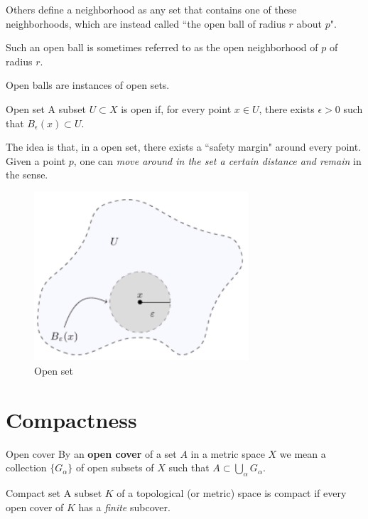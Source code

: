 \begin{remark}
Others define a neighborhood as any set that contains one of these neighborhoods, which are instead called ``the open ball of radius $r$ about $p$".
\end{remark}

Such an open ball is sometimes referred to as the open neighborhood of $p$ of radius $r$.

Open balls are instances of open sets.

\begin{defn}{Open set}{}
A subset $U \subset X$ is open if, for every point $x \in U$, there exists $\epsilon > 0$ such that $B_{\epsilon}(x) \subset U$.
\end{defn}

The idea is that, in a open set, there exists a ``safety margin" around every point. Given a point $p$, one can \emph{move around in the set a certain distance and remain} in the sense.

\begin{figure}[H]
    \centering
    \includegraphics[width=8cm]{images/open_set.png}
    \caption{Open set}
\end{figure}

\section{Compactness}
\begin{defn}{Open cover}{}
By an \textbf{open cover} of a set $A$ in a metric space $X$ we mean a collection $\{G_\alpha\}$ of open subsets of $X$ such that $A \subset \bigcup_\alpha G_\alpha$.
\end{defn}

\begin{defn}{Compact set}{}
A subset $K$ of a topological (or metric) space is compact if every open cover of $K$ has a \emph{finite} subcover.
\end{defn}

